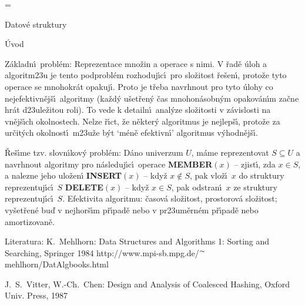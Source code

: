 



\magnification=
\pagewidth{5.5in}
\pageheight{19.5cm}


\def \emph#1{\underbar{#1}}
\def \Prob{\operatorname{Prob}}
\def \var{\operatorname{var}}

\heading
Datov\'e struktury
\endheading

\subhead
\'Uvod
\endsubhead

\flushpar Z\'akladn\'\i\ probl\'em: Reprezentace mno\v zin a 
operace s nimi. V \v rad\v e \'uloh a algoritm\accent23u je tento 
podprobl\'em rozhoduj\'\i c\'\i\ pro slo\v zitost \v re\v sen\'\i , proto\v ze 
tyto operace se mnohokr\'at opakuj\'\i . Proto je t\v reba 
navrhnout pro tyto \'ulohy co nejefektivn\v ej\v s\'\i\ algoritmy 
(ka\v zd\'y u\v set\v ren\'y \v cas mnohon\'asobn\'ym opakov\'an\'\i m za\v cne 
hr\'at d\accent23ule\v zitou roli). To vede k detailn\'\i\ 
anal\'yze slo\v zitosti v z\'avislosti na vn\v ej\v s\'\i ch okolnostech. 
Nelze \v r\'\i ct, 
\v ze n\v ekter\'y algoritmus je nejlep\v s\'\i , proto\v ze za ur\v cit\'ych 
okolnost\'\i\ m\accent23u\v ze b\'yt `m\'en\v e efektivn\'\i ' algoritmus 
v\'yhodn\v ej\v s\'\i .
\medskip

\flushpar \v Re\v s\'\i me tzv. slovn\'\i kov\'y probl\'em: D\'ano 
univerzum $U$, m\'ame reprezentovat $S\subseteq U$ a navrhnout algoritmy pro 
n\'asle\-duj\'\i c\'\i\ operace\newline 
{\bf MEMBER$(x)$} -- zjist\'\i , zda $x\in S$, a nalezne jeho 
ulo\v zen\'\i\newline 
{\bf INSERT$(x)$} -- kdy\v z $x\notin S$, pak vlo\v z\'\i\ $x$ do struktury 
repre\-zentuj\'\i c\'\i\ $S$\newline 
{\bf DELETE$(x)$} -- kdy\v z $x\in S$, pak odstran\'\i\ $x$ ze struktury 
reprezentuj\'\i c\'\i\ $S$.\newline 
Efektivita algoritmu: \v casov\'a slo\v zitost, prostorov\'a 
slo\v zitost;\newline 
vy\-\v set\v ren\'e bu\v d v nejhor\v s\'\i m p\v r\'\i pad\v e nebo v 
pr\accent23um\v ern\'em p\v r\'\i pad\v e nebo amortizovan\v e.
\medskip

\flushpar Literatura:\newline 
K.~Mehlhorn: Data Structures and Algorithms 1: Sorting 
and Searching, Springer 1984\newline 
http://www.mpi-sb.mpg.de/$^{\thicksim}$mehlhorn/DatAlgbooks.html
\smallskip

\flushpar J.~S.~Vitter, W.-Ch.~Chen: Design and Analysis of 
Coalesced Hashing, Oxford Univ. Press, 1987
\newpage

